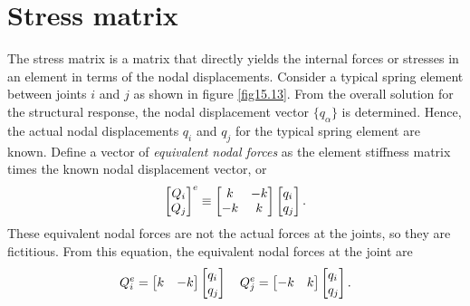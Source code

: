 \documentclass{AeroStructure-ERJohnson}
\begin{document}
\section{Stress matrix}\label{sec15.6}

The stress matrix is a matrix that directly yields the internal forces or stresses in an element in terms of the nodal displacements. Consider a typical spring element between joints $i$ and $j$ as shown in figure \ref{fig15.13}. From the overall solution for the structural response, the nodal displacement vector $\{q_{\alpha}\}$ is determined. Hence, the actual nodal displacements $q_{i}$ and $q_{j}$ for the typical spring element are known. Define a vector of \textit{equivalent nodal forces} as the element stiffness matrix times the known nodal displacement vector, or
{\def\thefigure{15.13}
}
\begin{align}\label{eq15.42}
\left[\begin{array}{@{}c@{}}Q_{i} \\Q_{j}\end{array}\right]^{e} \equiv\left[\begin{array}{@{}cc@{}}k & -k \\-k & k\end{array}\right]\left[\begin{array}{@{}l@{}}q_{i} \\q_{j}\end{array}\right].
\end{align}
These equivalent nodal forces are not the actual forces at the joints, so they are fictitious. From this equation, the equivalent nodal forces at the joint are
\begin{align}\label{eq15.43}
Q_{i}^{e}=\left[\begin{array}{@{}ll@{}}k & -k\end{array}\right]\left[\begin{array}{@{}l@{}}q_{i} \\q_{j}\end{array}\right] \quad Q_{j}^{e}=\left[\begin{array}{@{}ll@{}}-k & k\end{array}\right]\left[\begin{array}{@{}l@{}}q_{i} \\q_{j}\end{array}\right].
\end{align}
\end{document}
